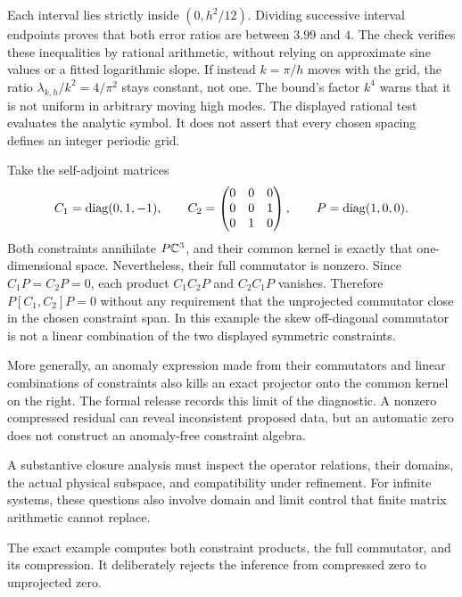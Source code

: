 Each interval lies strictly inside $(0,h^2/12)$. Dividing successive interval endpoints proves that both error ratios are between $3.99$ and $4$. The check verifies these inequalities by rational arithmetic, without relying on approximate sine values or a fitted logarithmic slope.
If instead $k=\pi/h$ moves with the grid, the ratio $\lambda_{k,h}/k^2=4/\pi^2$ stays constant, not one. The bound's factor $k^4$ warns that it is not uniform in arbitrary moving high modes. The displayed rational test evaluates the analytic symbol. It does not assert that every chosen spacing defines an integer periodic grid.

Take the self-adjoint matrices
\[
C_1=\operatorname{diag}(0,1,-1),\qquad
C_2=\begin{pmatrix}0&0&0\\0&0&1\\0&1&0\end{pmatrix},\qquad
P=\operatorname{diag}(1,0,0).
\]
Both constraints annihilate $P\mathbb C^3$, and their common kernel is exactly that one-dimensional space. Nevertheless, their full commutator is nonzero.
Since $C_1P=C_2P=0$, each product $C_1C_2P$ and $C_2C_1P$ vanishes. Therefore $P[C_1,C_2]P=0$ without any requirement that the unprojected commutator close in the chosen constraint span. In this example the skew off-diagonal commutator is not a linear combination of the two displayed symmetric constraints.

More generally, an anomaly expression made from their commutators and linear combinations of constraints also kills an exact projector onto the common kernel on the right. The formal release records this limit of the diagnostic. A nonzero compressed residual can reveal inconsistent proposed data, but an automatic zero does not construct an anomaly-free constraint algebra.

A substantive closure analysis must inspect the operator relations, their domains, the actual physical subspace, and compatibility under refinement. For infinite systems, these questions also involve domain and limit control that finite matrix arithmetic cannot replace.

The exact example computes both constraint products, the full commutator, and its compression. It deliberately rejects the inference from compressed zero to unprojected zero.

